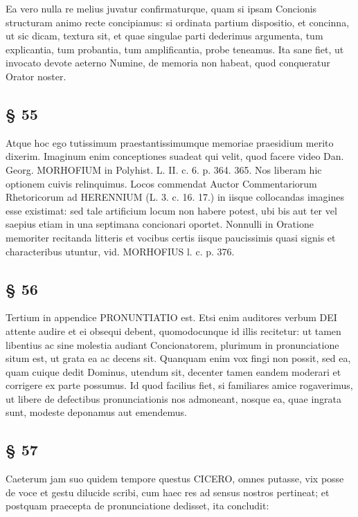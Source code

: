 Ea vero nulla re melius juvatur confirmaturque, quam si ipsam Concionis structuram animo recte concipiamus: si ordinata partium dispositio, et concinna, ut sic dicam, textura sit, et quae singulae parti dederimus argumenta, tum explicantia, tum probantia, tum amplificantia, probe teneamus. Ita sane fiet, ut invocato devote aeterno Numine, de memoria non habeat, quod conqueratur Orator noster.

\subsection{§ 55}

Atque hoc ego tutissimum praestantissimumque memoriae praesidium merito dixerim. Imaginum enim conceptiones suadeat qui velit, quod facere video Dan. Georg. MORHOFIUM in Polyhist. L. II. c. 6. p. 364. 365. Nos liberam hic optionem cuivis relinquimus. Locos commendat Auctor Commentariorum Rhetoricorum ad HERENNIUM (L. 3. c. 16. 17.) in iisque collocandas imagines esse existimat: sed tale artificium locum non habere potest, ubi bis aut ter vel saepius etiam in una septimana concionari oportet. Nonnulli in Oratione memoriter recitanda litteris et vocibus certis iisque paucissimis quasi signis et characteribus utuntur, vid. MORHOFIUS l. c. p. 376.

\subsection{§ 56}

Tertium in appendice PRONUNTIATIO est. Etsi enim auditores verbum DEI attente audire et ei obsequi debent, quomodocunque id illis recitetur: ut tamen
libentius ac sine molestia audiant Concionatorem, plurimum in pronunciatione situm est, ut grata ea ac decens sit. Quanquam enim vox fingi non possit, sed ea, quam cuique dedit Dominus, utendum sit, decenter tamen eandem moderari et corrigere ex parte possumus. Id quod facilius fiet, si familiares amice rogaverimus, ut libere de defectibus pronunciationis nos admoneant, nosque ea, quae ingrata sunt, modeste deponamus aut emendemus.

\subsection{§ 57}

Caeterum jam suo quidem tempore questus CICERO, omnes putasse, vix posse de voce et gestu dilucide scribi, cum haec res ad sensus nostros pertineat; et postquam praecepta de pronunciatione dedisset, ita concludit:

